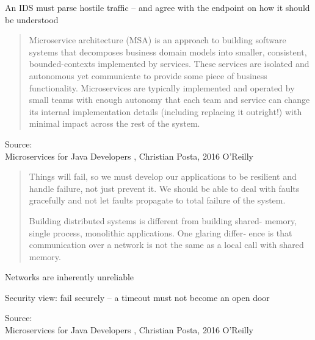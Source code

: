 \documentclass[Screen16to9,17pt]{foils}
\begin{document}
\begin{list1}
\item An IDS must parse hostile traffic -- and agree with the endpoint on how it should be understood
\end{list1}



\begin{quote}\small
  Microservice architecture (MSA) is an approach to building software systems that decomposes business domain models into smaller,
  consistent, bounded-contexts implemented by services. These services are isolated and autonomous yet communicate to provide some
  piece of business functionality. Microservices are typically implemented and operated by small teams with enough autonomy that
  each team and service can change its internal implementation
  details (including replacing it outright!) with minimal impact across
  the rest of the system.
\end{quote}

Source: {\footnotesize\\
Microservices for Java Developers , Christian Posta, 2016 O’Reilly}



\begin{quote}
  Things will fail, so we must develop our applications to be resilient and handle failure, not just prevent it. We should
  be able to deal with faults gracefully and not let faults propagate to
  total failure of the system.

  Building distributed systems is different from building shared-
memory, single process, monolithic applications. One glaring differ‐
ence is that communication over a network is not the same as a local
call with shared memory.
\end{quote}

\begin{list2}
\item Networks are inherently unreliable
\item Security view: fail securely -- a timeout must not become an open door
\end{list2}
Source: {\footnotesize\\
Microservices for Java Developers , Christian Posta, 2016 O’Reilly}


\end{document}

